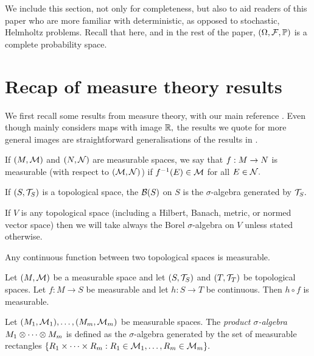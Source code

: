 We include this section, not only for completeness, but also to aid readers of this paper who are more familiar with deterministic, as opposed to stochastic, Helmholtz problems. Recall that here, and in the rest of the paper, $\OFP$ is a complete probability space.

\section{Recap of measure theory results}

We first recall some results from measure theory, with our main reference \cite{Bo:07}. Even though \cite{Bo:07} mainly considers maps with image $\mathbb R,$ the results we quote for more general images are straightforward generalisations of the results in \cite{Bo:07}.

\begin{definition}\label{def:meas}
If $(M,\mathcal M)$ and $(N,\mathcal N)$ are measurable spaces, we say that $f:M\rightarrow N$ is measurable (with respect to $(\mathcal M,\mathcal N)$) if $f^{-1}(E) \in \mathcal M$ for all $E \in \mathcal N.$
\end{definition}



\label{def:borelsigma}
If $(S,\mathcal T_{S})$ is a topological space, the  $\Borel{S}$ on $S$ is the $\sigma$-algebra generated by $\mathcal T_{S}.$
\ede


If $V$ is any topological space (including a Hilbert, Banach, metric, or normed vector space) then we will take always the Borel $\sigma$-algebra on $V$ unless stated otherwise.


 \label{lem:contmeas}
Any continuous function between two topological spaces is measurable.
\ele





\label{lem:contplusmeas}
Let $(M,\mathcal M)$ be a measurable space and let $\mleft(S,\TS\mright)$ and $\mleft(T,\TopT\mright)$ be topological spaces. Let $f:M \rightarrow S$ be measurable and let $h : S \rightarrow T$ be continuous. Then $h \circ f$ is measurable.
\ele

\label{def:prodsigma}
Let $\mleft(\M_1,\FM_1\mright),\ldots,\mleft(\M_m,\FM_m\mright)$ be measurable spaces. The \emph{product $\sigma$-algebra} $M_1\otimes\cdots\otimes M_m$ is defined as the $\sigma$-algebra generated by the set of measurable rectangles
$%
\set{R_{1} \times \cdots \times R_m  \st R_{1} \in \FM_1, \ldots, R_m \in \FM_m}.
$
\ede


